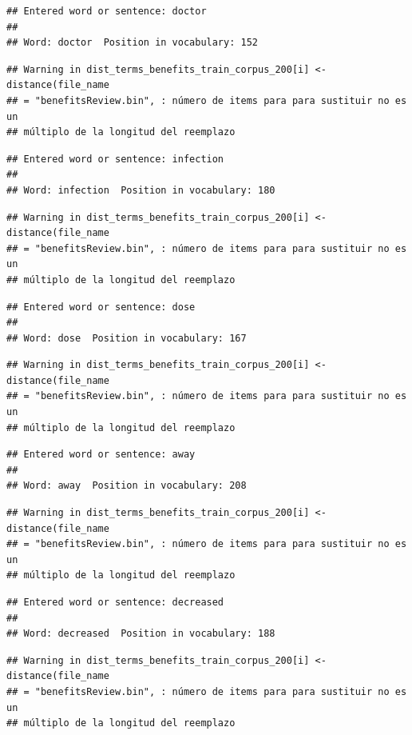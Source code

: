 \documentclass[spanish,]{article}
\begin{document}
\begin{verbatim}
## Entered word or sentence: doctor
## 
## Word: doctor  Position in vocabulary: 152
\end{verbatim}

\begin{verbatim}
## Warning in dist_terms_benefits_train_corpus_200[i] <- distance(file_name
## = "benefitsReview.bin", : número de items para para sustituir no es un
## múltiplo de la longitud del reemplazo
\end{verbatim}

\begin{verbatim}
## Entered word or sentence: infection
## 
## Word: infection  Position in vocabulary: 180
\end{verbatim}

\begin{verbatim}
## Warning in dist_terms_benefits_train_corpus_200[i] <- distance(file_name
## = "benefitsReview.bin", : número de items para para sustituir no es un
## múltiplo de la longitud del reemplazo
\end{verbatim}

\begin{verbatim}
## Entered word or sentence: dose
## 
## Word: dose  Position in vocabulary: 167
\end{verbatim}

\begin{verbatim}
## Warning in dist_terms_benefits_train_corpus_200[i] <- distance(file_name
## = "benefitsReview.bin", : número de items para para sustituir no es un
## múltiplo de la longitud del reemplazo
\end{verbatim}

\begin{verbatim}
## Entered word or sentence: away
## 
## Word: away  Position in vocabulary: 208
\end{verbatim}

\begin{verbatim}
## Warning in dist_terms_benefits_train_corpus_200[i] <- distance(file_name
## = "benefitsReview.bin", : número de items para para sustituir no es un
## múltiplo de la longitud del reemplazo
\end{verbatim}

\begin{verbatim}
## Entered word or sentence: decreased
## 
## Word: decreased  Position in vocabulary: 188
\end{verbatim}

\begin{verbatim}
## Warning in dist_terms_benefits_train_corpus_200[i] <- distance(file_name
## = "benefitsReview.bin", : número de items para para sustituir no es un
## múltiplo de la longitud del reemplazo
\end{verbatim}
\end{document}
